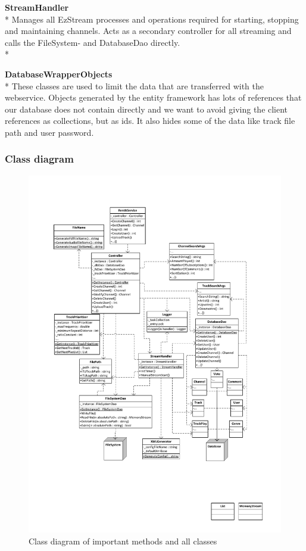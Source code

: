 \documentclass[a4paper,11pt,report]{article}
\begin{document}
{\textbf{StreamHandler} \\*
Manages all EzStream processes and operations required for starting, stopping and maintaining channels. Acts as a secondary controller for all streaming and calls the FileSystem- and DatabaseDao directly. \\*

\textbf{DatabaseWrapperObjects} \\*
These classes are used to limit the data that are transferred with the webservice. Objects generated by the entity framework has lots of references that our database does not contain directly and we want to avoid giving the client references as collections, but as ids. It also hides some of the data like track file path and user password.

\subsubsection{Class diagram}
\begin{figure}[H]
  \centering
\includegraphics[width=400pt,keepaspectratio=true,trim=80pt 170pt 80pt 50pt]{./ClassDiagramv2.pdf}
\caption{Class diagram of important methods and all classes}
\end{figure}

}
\end{document}
